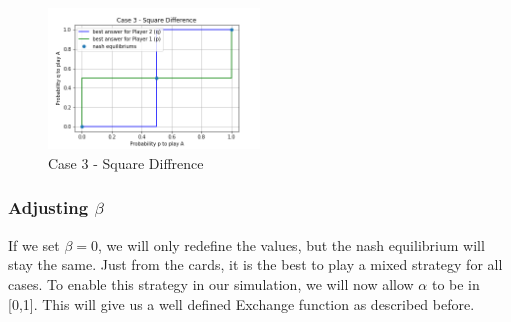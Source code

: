 \begin{figure}[!ht]
    \centering
    \includegraphics[width=0.5\textwidth]{Bilder/5_diff}
    \caption{Case 3 - Square Diffrence}
    \label{fig:meine-grafik}
\end{figure}

\subsubsection{Adjusting $\beta$}

If we set $\beta = 0$, we will only redefine the values, but the nash equilibrium will stay the same. Just from the cards, it is the best to play a mixed strategy for all cases. To enable this strategy in our simulation, we will now allow $\alpha$ to be in [0,1]. This will give us a well defined Exchange function as described before.

